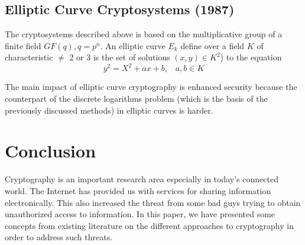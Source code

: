\documentclass{article}
\begin{document}
\subsection{Elliptic Curve Cryptosystems (1987)}

The cryptosystems described above is based on the multiplicative group
of a finite field $GF(q),q=p^{n}$\cite{koblitz_elliptic_1987}. An
elliptic curve $E_{k}$ define over a field $K$ of characteristic
$\neq$ 2 or 3 is the set of solutions $(x,y)\in K^{2}$) to the equation
\[
y^{2}=X^{2}+ax+b,\;\;\; a,b\in K
\]


The main impact of elliptic curve cryptography is enhanced security
because the counterpart of the discrete logarithms problem (which
is the basis of the previously discussed methods) in elliptic curves
is harder\cite{koblitz_elliptic_1987}. 


\section{Conclusion} 

Cryptography is an important research area especially in today’s connected world. The Internet has provided us with services for sharing information electronically. This also increased the threat from some bad guys trying to obtain unauthorized access to information. In this paper, we have presented some concepts from existing literature on the different approaches to cryptography in order to address such threats.



\nocite{*}
\end{document}
